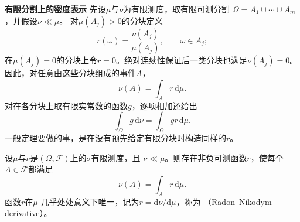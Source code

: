 \par\medskip\noindent\textbf{有限分割上的密度表示}\quad
先设\(\mu\)与\(\nu\)为有限测度，取有限可测分割
\(\Omega=A_1\mathbin{\dot\cup}\cdots\mathbin{\dot\cup}A_m\)，并假设\(\nu\ll\mu\)。
对\(\mu(A_j)>0\)的分块定义
\[ r(\omega)=\frac{\nu(A_j)}{\mu(A_j)},
  \qquad \omega\in A_j; \]
在\(\mu(A_j)=0\)的分块上令\(r=0\)。绝对连续性保证后一类分块也满足\(\nu(A_j)=0\)。因此，对任意由这些分块组成的事件\(A\)，
\[ \nu(A)=\int_A r\,\mathrm{d}\mu. \]
对在各分块上取有限实常数的函数\(g\)，逐项相加还给出
\begin{equation}
  \int_{\Omega}g\,\mathrm{d}\nu
  =
  \int_{\Omega}gr\,\mathrm{d}\mu.
  \label{eq:probability-finite-change-measure}
\end{equation}
一般定理要做的事，是在没有预先给定有限分块时构造同样的\(r\)。

\begin{theorem}
\label{thm:probability-radon-nikodym}
设\(\mu\)与\(\nu\)是\((\Omega,\mathcal{F})\)上的\(\sigma\)有限测度，且
\(\nu\ll\mu\)。则存在非负可测函数\(r\)，使每个\(A\in\mathcal{F}\)都满足
\begin{equation}
  \nu(A)=\int_A r\,\mathrm{d}\mu.
  \label{eq:probability-rn-representation}
\end{equation}
函数\(r\)在\(\mu\)-几乎处处意义下唯一，记为\(r=\mathrm{d}\nu/\mathrm{d}\mu\)，称为
（Radon--Nikodym derivative）。
\end{theorem}


